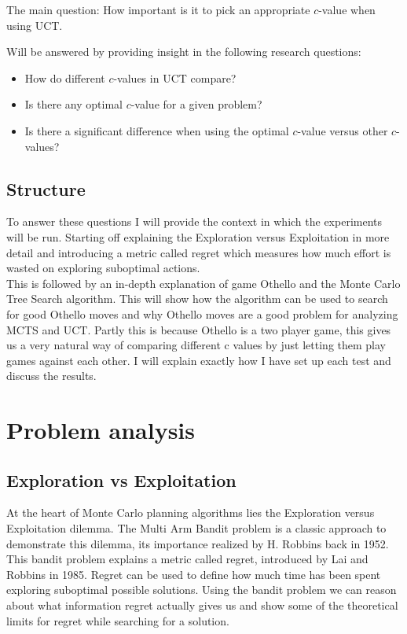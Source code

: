 \documentclass[
11pt, %
english, %
singlespacing, %
headsepline, %
]{MastersDoctoralThesis} %
\begin{document}
The main question: How important is it to pick an appropriate $c$-value when using UCT.

Will be answered by providing insight in the following research questions:
\begin{itemize}
	\item How do different $c$-values in UCT compare?
	\item Is there any optimal $c$-value for a given problem?
	\item Is there a significant difference when using the optimal $c$-value versus other $c$-values?
\end{itemize}
\section{Structure}
To answer these questions I will provide the context in which the experiments will be run. Starting off explaining the Exploration versus Exploitation in more detail and introducing a metric called regret which measures how much effort is wasted on exploring suboptimal actions.\\ This is followed by an in-depth explanation of game Othello and the Monte Carlo Tree Search algorithm. This will show how the algorithm can be used to search for good Othello moves and why Othello moves are a good problem for analyzing MCTS and UCT. Partly this is because Othello is a two player game, this gives us a very natural way of comparing different c values by just letting them play games against each other. I will explain exactly how I have set up each test and discuss the results.

\chapter{Problem analysis}

\section{Exploration vs Exploitation}
At the heart of Monte Carlo planning algorithms lies the Exploration versus Exploitation dilemma. The Multi Arm Bandit problem is a classic approach to demonstrate this dilemma, its importance realized by H. Robbins back in 1952. This bandit problem explains a metric called regret, introduced by Lai and Robbins\cite{Lai+Robbins:1985} in 1985. Regret can be used to define how much time has been spent exploring suboptimal possible solutions. Using the bandit problem we can reason about what information regret actually gives us and show some of the theoretical limits for regret while searching for a solution.
\end{document}
